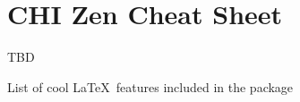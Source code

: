 \clearpage
\pagebreak
\onecolumn
\appendix


\section{CHI Zen Cheat Sheet}

TBD

List of cool \LaTeX\ features included in the package